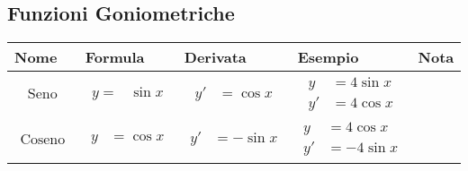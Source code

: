 \documentclass[../../main]{subfiles}
\begin{document}
\subsection{Funzioni Goniometriche}
\begin{center}
    \label{tab:derivate:goniometriche}
    \begin{longtable}{ |p{7em}|p{5em}|p{5em}|p{7em}|p{5cm}| }%
        \hhline{|=|=|=|=|=|}
        Nome & Formula & Derivata & Esempio & Nota \\
        \endfirsthead
        \hhline{|=|=|=|=|=|}
        \endlastfoot
        
        \hline
        
        \begin{align*}
            \text{Seno}
        \end{align*} &
        {
            \begin{align*}
                y=&\sin{x} 
            \end{align*}
        } &
        {
            \begin{align*}
                y'&=\cos{x} 
            \end{align*}
        } &
        {
            \begin{align*}
                y &= 4\sin{x}  \\
                y' &= 4\cos{x} 
            \end{align*}
        } &
        {
        \begin{center}
        \end{center}
        } \\

        \hline

        \begin{align*}
            \text{Coseno}
        \end{align*} &
        {
            \begin{align*}
                y&=\cos{x} 
            \end{align*}
        } &
        {
            \begin{align*}
                y'&=-\sin{x} 
            \end{align*}
        } &
        {
            \begin{align*}
                y &= 4\cos{x}  \\
                y' &= -4\sin{x} 
            \end{align*}
        } &
        {
        \begin{center}
        \end{center}
        } \\


\end{longtable}
\end{center}
\end{document}
